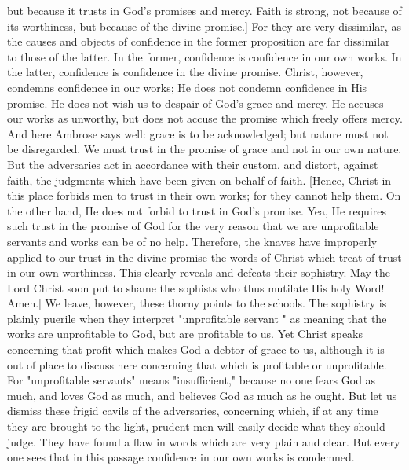 but because it trusts in God's promises and mercy.  Faith is strong,
not because of its worthiness, but because of the divine promise.]
For they are very dissimilar, as the causes and objects of confidence
in the former proposition are far dissimilar to those of the latter.
In the former, confidence is confidence in our own works.  In the
latter, confidence is confidence in the divine promise.  Christ,
however, condemns confidence in our works; He does not condemn
confidence in His promise.  He does not wish us to despair of God's
grace and mercy.  He accuses our works as unworthy, but does not
accuse the promise which freely offers mercy.  And here Ambrose says
well: grace is to be acknowledged; but nature must not be disregarded.
We must trust in the promise of grace and not in our own nature.
But the adversaries act in accordance with their custom, and distort,
against faith, the judgments which have been given on behalf of faith.
[Hence, Christ in this place forbids men to trust in their own
works; for they cannot help them.  On the other hand, He does not
forbid to trust in God's promise.  Yea, He requires such trust in the
promise of God for the very reason that we are unprofitable servants
and works can be of no help.  Therefore, the knaves have improperly
applied to our trust in the divine promise the words of Christ which
treat of trust in our own worthiness.  This clearly reveals and
defeats their sophistry.  May the Lord Christ soon put to shame the
sophists who thus mutilate His holy Word!  Amen.] We leave, however,
these thorny points to the schools.  The sophistry is plainly puerile
when they interpret "unprofitable servant " as meaning that the works
are unprofitable to God, but are profitable to us.  Yet Christ speaks
concerning that profit which makes God a debtor of grace to us,
although it is out of place to discuss here concerning that which is
profitable or unprofitable.  For "unprofitable servants" means
"insufficient," because no one fears God as much, and loves God as
much, and believes God as much as he ought.  But let us dismiss these
frigid cavils of the adversaries, concerning which, if at any time
they are brought to the light, prudent men will easily decide what
they should judge.  They have found a flaw in words which are very
plain and clear.  But every one sees that in this passage confidence
in our own works is condemned.

